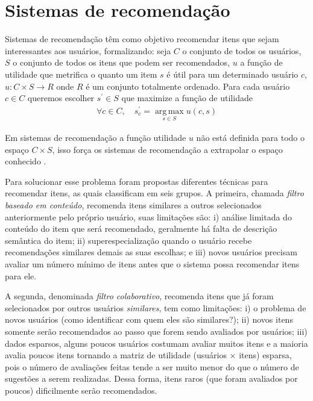 \section{Sistemas de recomendação}\label{SEC_SISTEMAS_RECOMENDACAO}
Sistemas de recomendação têm como objetivo recomendar itens que sejam interessantes aos usuários, formalizando: seja \(C\) o conjunto de todos os usuários, \(S\) o conjunto de todos os itens que podem ser recomendados, \(u\) a função de utilidade que metrifica o quanto um item \(s\) é útil para um determinado usuário \(c\), \(u:C \times S\rightarrow R\) onde \(R\) é um conjunto totalmente ordenado. Para cada usuário \(c \in C \) queremos escolher \(s^{'} \in S \) que maximize a função de utilidade 
\begin{align}
\forall c \in C,  \quad s_{c}^{'} =  \operatorname*{arg\,max}_{s \in S} u(c,s) \label{formalizar_recomendacao}
\end{align}

Em sistemas de recomendação a função utilidade \(u\) não está definida para todo o espaço \(C \times S\), isso força os sistemas de recomendação a extrapolar o espaço conhecido \cite{Adomavicius2005}.

Para solucionar esse problema foram propostas diferentes técnicas para recomendar itens, as quais  classificam em seis grupos. A primeira, chamada \emph{filtro baseado em conteúdo}, recomenda itens similares a outros selecionados anteriormente pelo próprio usuário, suas limitações são: i) análise limitada do conteúdo do item que será recomendado, geralmente há falta de descrição semântica do item; ii) superespecialização quando o usuário recebe recomendações similares demais as suas escolhas; e iii) novos usuários precisam avaliar um número mínimo de itens antes que o sistema possa recomendar itens para ele.

A segunda, denominada \emph{filtro colaborativo}, recomenda itens que já foram selecionados por outros usuários \emph{similares}, tem como limitações: i) o problema de novos usuários (como identificar com quem eles são similares?); ii) novos itens somente serão recomendados ao passo que forem sendo avaliados por usuários; iii) dados esparsos, alguns poucos usuários costumam avaliar muitos itens e a maioria avalia poucos itens tornando a matriz de utilidade (usuários \(\times\) itens) esparsa, pois o número de avaliações feitas tende a ser muito menor do que o número de sugestões a serem realizadas. Dessa forma, itens raros (que foram avaliados por poucos) dificilmente serão recomendados.

